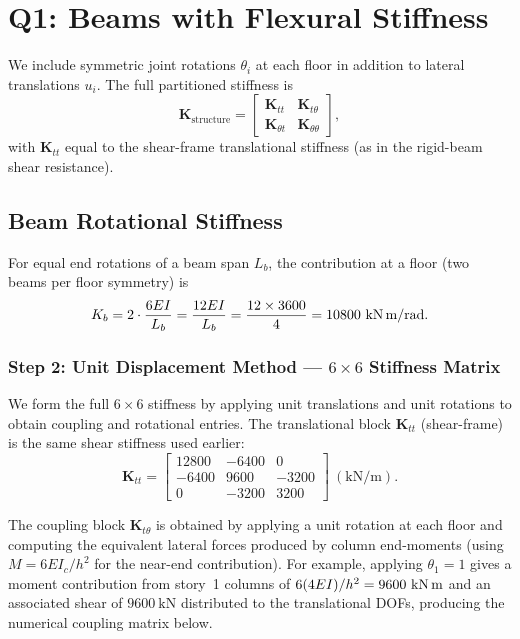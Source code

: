 \documentclass[12pt,a4paper]{article}
\newcommand{\mat}[1]{\mathbf{#1}}
\begin{document}
\section{Q1: Beams with Flexural Stiffness}
We include symmetric joint rotations $\theta_i$ at each floor in addition to lateral translations $u_i$. The full partitioned stiffness is
\begin{equation}
  \mat{K}_{\mathrm{structure}} = \begin{bmatrix}\mat{K}_{tt} & \mat{K}_{t\theta} \\ \mat{K}_{\theta t} & \mat{K}_{\theta\theta}\end{bmatrix},
\end{equation}
with $\mat{K}_{tt}$ equal to the shear-frame translational stiffness (as in the rigid-beam shear resistance).

\subsection{Beam Rotational Stiffness}
For equal end rotations of a beam span $L_b$, the contribution at a floor (two beams per floor symmetry) is
\begin{equation}
  K_b = 2\cdot\frac{6EI}{L_b} = \frac{12EI}{L_b} = \frac{12\times3600}{4} = 10800~\text{kN\,m/rad}.
\end{equation}

\subsubsection*{Step 2: Unit Displacement Method --- $6\times6$ Stiffness Matrix}
We form the full $6\times6$ stiffness by applying unit translations and unit rotations to obtain coupling and rotational entries. The translational block $\mat{K}_{tt}$ (shear-frame) is the same shear stiffness used earlier:
\begin{equation}
  \mat{K}_{tt} = \begin{bmatrix}12800 & -6400 & 0\\-6400 & 9600 & -3200\\0 & -3200 & 3200\end{bmatrix}~(\text{kN/m}).
\end{equation}

The coupling block $\mat{K}_{t\theta}$ is obtained by applying a unit rotation at each floor and computing the equivalent lateral forces produced by column end-moments (using $M=6EI_c/h^2$ for the near-end contribution). For example, applying $\theta_1=1$ gives a moment contribution from story~1 columns of $6(4EI)/h^2=9600~\text{kN\,m}$ and an associated shear of $9600~\text{kN}$ distributed to the translational DOFs, producing the numerical coupling matrix below.
\end{document}
